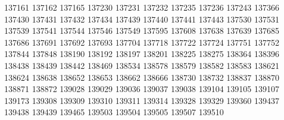 137161
137162
137165
137230
137231
137232
137235
137236
137243
137366
137430
137431
137432
137434
137439
137440
137441
137443
137530
137531
137539
137541
137544
137546
137549
137595
137608
137638
137639
137685
137686
137691
137692
137693
137704
137718
137722
137724
137751
137752
137844
137848
138190
138192
138197
138201
138225
138275
138364
138396
138438
138439
138442
138469
138534
138578
138579
138582
138583
138621
138624
138638
138652
138653
138662
138666
138730
138732
138837
138870
138871
138872
139028
139029
139036
139037
139038
139104
139105
139107
139173
139308
139309
139310
139311
139314
139328
139329
139360
139437
139438
139439
139465
139503
139504
139505
139507
139510
